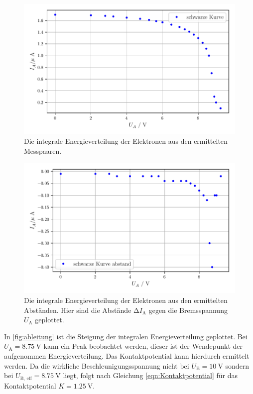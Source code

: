\begin{figure}
    \centering
    \includegraphics[width=\textwidth]{bilder/integral.pdf}
    \caption{Die integrale Energieverteilung der Elektronen aus den ermittelten Messpaaren.}
    \label{fig:integral}
\end{figure}

\begin{figure}
    \centering
    \includegraphics[width=\textwidth]{bilder/abstande.pdf}
    \caption{Die integrale Energieverteilung der Elektronen aus den ermittelten Abständen.
    Hier sind die Abstände $\increment I_\text{A}$ gegen die Bremsspannung $U_\text{A}$ geplottet.}
    \label{fig:abstande}
\end{figure}
\noindent
In \autoref{fig:ableitung} ist die Steigung der integralen Energieverteilung geplottet.
Bei $U_\text{A} = \SI{8.75}{\volt}$ kann ein Peak beobachtet werden, dieser ist der Wendepunkt der aufgenommen Energieverteilung.
Das Kontaktpotential kann hierdurch ermittelt werden.
Da die wirkliche Beschleunigungsspannung nicht bei $U_\text{B} = \SI{10}{\volt}$ sondern bei $U_\text{B, eff} = \SI{8.75}{\volt}$ liegt,
folgt nach Gleichung \eqref{eqn:Kontaktpotential} für das Kontaktpotential $K = \SI{1.25}{\volt}$. \\

